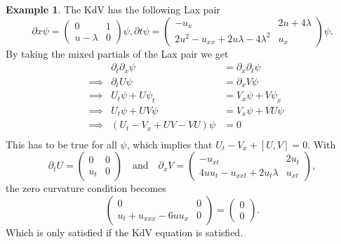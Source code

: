 \documentclass[english,master]{liumaiex}
\theoremstyle{plain}
\theoremstyle{definition}
\newtheorem{example}[proposition]{Example}
\begin{document}
\begin{example}
The KdV has the following Lax pair
\begin{subequations}
  \begin{equation}
    \partial x \psi =
    \begin{pmatrix}
      0 & 1 \\
      u - \lambda & 0
    \end{pmatrix}
	\psi,
  \end{equation}
  \begin{equation}
    \partial t \psi =
    \begin{pmatrix}
      -u_x & 2u + 4\lambda \\
      2u^2 - u_{xx} + 2u\lambda - 4\lambda^2 & u_x
    \end{pmatrix}
    \psi.
  \end{equation}
\end{subequations}
By taking the mixed partials of the Lax pair we get
\begin{equation}
\begin{aligned}
	& & \partial_t \partial_x \psi &= \partial_x \partial_t \psi \\
	& \implies & \partial_t U \psi &= \partial_x V \psi \\  
	& \implies & U_t \psi + U \psi_t &= V_x \psi + V \psi_x \\
	& \implies & U_t \psi + U V \psi &= V_x \psi + V U \psi \\
	& \implies & (U_t - V_x + U V - V U) \psi &= 0 \\
\end{aligned}
\end{equation}
This has to be true for all $\psi$, which implies that $U_t - V_x + [U, V] = 0$. With
\begin{equation}
\partial_t U =
\begin{pmatrix}
	0 & 0 \\
	u_t & 0
\end{pmatrix}
\quad \text{and} \quad
\partial_x V =
\begin{pmatrix}
	-u_{xt} & 2u_t \\
	4uu_t - u_{xxt} + 2u_t\lambda & u_{xt}
\end{pmatrix},
\end{equation}
the zero curvature condition becomes
\begin{equation}
	\begin{pmatrix}
	0 & 0\\
	u_t + u_{xxx} - 6u u_x & 0
	\end{pmatrix} =
	\begin{pmatrix} 0 \\ 0 \end{pmatrix}.
\end{equation}
Which is only satisfied if the KdV equation is satisfied.
\end{example}
\end{document}
